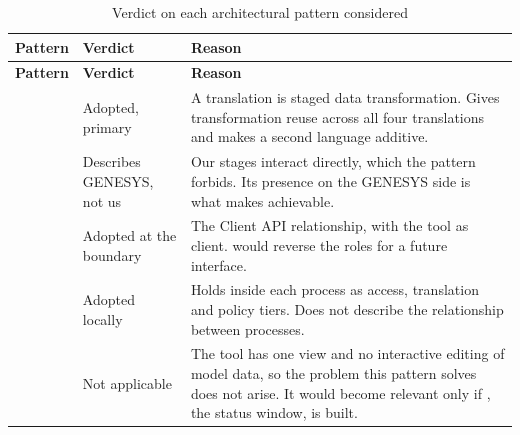 \begin{longtable}{L{0.20\textwidth}L{0.17\textwidth}L{0.55\textwidth}}
	\caption{Verdict on each architectural pattern considered}\label{tab:verdicts}\\
	\toprule
	\textbf{Pattern} & \textbf{Verdict} & \textbf{Reason} \\
	\midrule
	\endfirsthead
	\toprule
	\textbf{Pattern} & \textbf{Verdict} & \textbf{Reason} \\
	\midrule
	\endhead

	 & Adopted, primary & A translation is staged
	data transformation. Gives transformation reuse across all four
	translations and makes a second language additive. \\
	\addlinespace
	 & Describes GENESYS, not us & Our stages interact
	directly, which the pattern forbids. Its presence on the GENESYS side is
	what makes  achievable. \\
	\addlinespace
	 & Adopted at the boundary & The Client API
	relationship, with the tool as client.  would reverse the roles
	for a future interface. \\
	\addlinespace
	 & Adopted locally & Holds inside each process as access,
	translation and policy tiers. Does not describe the relationship between
	processes. \\
	\addlinespace
	 & Not applicable & The tool has one view and no interactive
	editing of model data, so the problem this pattern solves does not arise.
	It would become relevant only if , the status window, is built. \\
	\bottomrule
\end{longtable}
